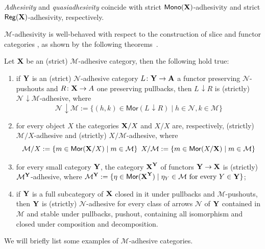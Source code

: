 \documentclass[runningheads,envcountsect]{llncs}
\def\X{\textbf {\textup{X}}}
\def\Y{\textbf {\textup{Y}}}
\def\A{\textbf {\textup{A}}}
\newcommand{\comma}[2]{#1\hspace{1pt} {\downarrow}#2}
\newcommand{\mor}{\mathsf{Mor}}
\newcommand{\mon}{\mathsf{Mono}}
\newcommand{\reg}{\mathsf{Reg}}
\begin{document}
\begin{remark}
	\label{rem:salva}
	\emph{Adhesivity} and \emph{quasiadhesivity} 
	\cite{lack2005adhesive,garner2012axioms} coincide with strict
	$\mon(\X) $-adhesivity and strict $\reg(\X)$-adhesivity,
	respectively.
\end{remark}


$\mathcal{M}$-adhesivity is well-behaved with respect to  the construction of slice and functor categories \cite{mac2013categories}, as shown by the following theorems~\cite{ehrig2006fundamentals,lack2005adhesive}.

\begin{theorem}
	\label{thm:slice-functors}
	Let $\X$ be an (strict) $\mathcal{M}$-adhesive category, then the following hold true:
	\begin{enumerate}
		\item if $\Y$ is an (strict) $\mathcal{N}$-adhesive category $L\colon \Y\to \A$ a functor preserving $\mathcal{N}$-pushouts and $R\colon \X\to A$ one preserving pullbacks, then $\comma{L}{R}$ is (strictly) $\comma{\mathcal{N}}{\mathcal{M}}$-adhesive, where
		\[\comma{\mathcal{N}}{\mathcal{M}}:=\{(h,k) \in \mor(\comma{L}{R}) \mid h\in \mathcal{N}, k\in \mathcal{M}\}\]
		\item for every object $X$
		the categories $\X/X$  and $X/X$ are, respectively, (strictly) $\mathcal{M}/X$-adhesive and (strictly) $X/\mathcal{M}$-adhesive, where
		\[\mathcal{M}/X:=\{m\in \mor(\X/X) \mid m\in
		\mathcal{M}\} \hspace{5pt} X/\mathcal{M}:=\{m\in \mor(X/\X) \mid m\in \mathcal{M}\}\]
		\item for every small category $\Y$, the category $\X^\Y$ of
		functors $\Y\to \X$ is (strictly) $\mathcal{M}^{\Y}$-adhesive, where
		$\mathcal{M}^{\Y}:=\{\eta \in \mor(\X^\Y) \mid \eta_Y \in
		\mathcal{M} \text{ for every } Y\in \Y\}$;
		\item if $\Y$ is a full subcategory of $\X$ closed in it under pullbacks and $\mathcal{M}$-pushouts, then $\Y$ is (strictly) $\mathcal{N}$-adhesive for every class of arrows $\mathcal{N}$ of $\Y$ contained in $\mathcal{M}$ and  stable under pullbacks, pushout, containing all isomorphism and closed under composition and decomposition.
	\end{enumerate} 
\end{theorem}

We will briefly list some examples of $\mathcal{M}$-adhesive categories.
\end{document}

